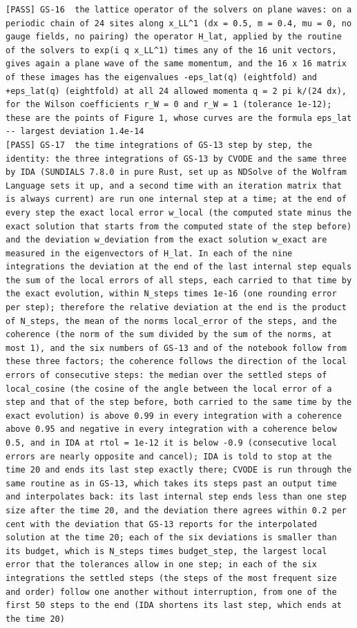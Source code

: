 \documentclass[
  10pt,
]{article}
\begin{document}
\begin{verbatim}
[PASS] GS-16  the lattice operator of the solvers on plane waves: on a periodic chain of 24 sites along x_LL^1 (dx = 0.5, m = 0.4, mu = 0, no gauge fields, no pairing) the operator H_lat, applied by the routine of the solvers to exp(i q x_LL^1) times any of the 16 unit vectors, gives again a plane wave of the same momentum, and the 16 x 16 matrix of these images has the eigenvalues -eps_lat(q) (eightfold) and +eps_lat(q) (eightfold) at all 24 allowed momenta q = 2 pi k/(24 dx), for the Wilson coefficients r_W = 0 and r_W = 1 (tolerance 1e-12); these are the points of Figure 1, whose curves are the formula eps_lat  -- largest deviation 1.4e-14
[PASS] GS-17  the time integrations of GS-13 step by step, the identity: the three integrations of GS-13 by CVODE and the same three by IDA (SUNDIALS 7.8.0 in pure Rust, set up as NDSolve of the Wolfram Language sets it up, and a second time with an iteration matrix that is always current) are run one internal step at a time; at the end of every step the exact local error w_local (the computed state minus the exact solution that starts from the computed state of the step before) and the deviation w_deviation from the exact solution w_exact are measured in the eigenvectors of H_lat. In each of the nine integrations the deviation at the end of the last internal step equals the sum of the local errors of all steps, each carried to that time by the exact evolution, within N_steps times 1e-16 (one rounding error per step); therefore the relative deviation at the end is the product of N_steps, the mean of the norms local_error of the steps, and the coherence (the norm of the sum divided by the sum of the norms, at most 1), and the six numbers of GS-13 and of the notebook follow from these three factors; the coherence follows the direction of the local errors of consecutive steps: the median over the settled steps of local_cosine (the cosine of the angle between the local error of a step and that of the step before, both carried to the same time by the exact evolution) is above 0.99 in every integration with a coherence above 0.95 and negative in every integration with a coherence below 0.5, and in IDA at rtol = 1e-12 it is below -0.9 (consecutive local errors are nearly opposite and cancel); IDA is told to stop at the time 20 and ends its last step exactly there; CVODE is run through the same routine as in GS-13, which takes its steps past an output time and interpolates back: its last internal step ends less than one step size after the time 20, and the deviation there agrees within 0.2 per cent with the deviation that GS-13 reports for the interpolated solution at the time 20; each of the six deviations is smaller than its budget, which is N_steps times budget_step, the largest local error that the tolerances allow in one step; in each of the six integrations the settled steps (the steps of the most frequent size and order) follow one another without interruption, from one of the first 50 steps to the end (IDA shortens its last step, which ends at the time 20) 

\end{verbatim}
\end{document}
